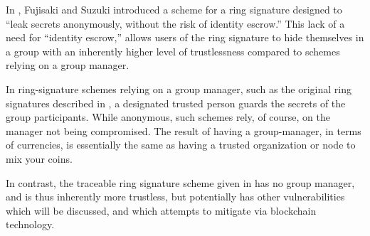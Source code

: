 \documentclass[12pt,english]{mrl}
\numberwithin{equation}{section}
\numberwithin{figure}{section}
\begin{document}
In \cite{FS}, Fujisaki and Suzuki introduced a scheme for a ring
signature designed to ``leak secrets anonymously, without the risk
of identity escrow.'' This lack of a need for ``identity escrow,''
allows users of the ring signature to hide themselves in a group with
an inherently higher level of trustlessness compared to schemes relying
on a group manager.

In ring-signature schemes relying on a group manager, such as the
original ring signatures described in \cite{CH}, a designated trusted
person guards the secrets of the group participants. While anonymous,
such schemes rely, of course, on the manager not being compromised.
The result of having a group-manager, in terms of currencies, is essentially
the same as having a trusted organization or node to mix your coins.

In contrast, the traceable ring signature scheme given in \cite{FS}
has no group manager, and is thus inherently more trustless, but potentially
has other vulnerabilities which will be discussed, and which \cite{CN}
attempts to mitigate via blockchain technology. 
\end{document}
